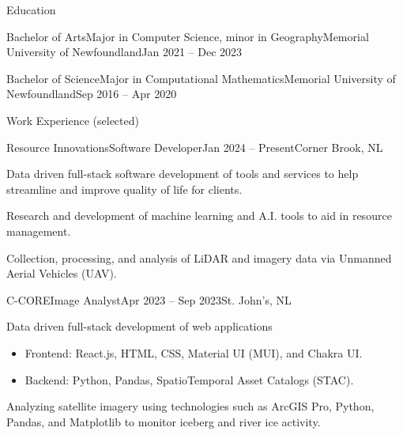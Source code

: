 \documentclass[]{Keenan-Nicholson-Resume}
\begin{document}
\resumeheader
{}
{}
{}
{}
{}

\begin{section}{Education}
    \begin{subsection}{Bachelor of Arts}{Major in Computer Science, minor in Geography}{Memorial University of Newfoundland}{Jan 2021 -- Dec 2023}
    \end{subsection}
    \begin{subsection}{Bachelor of Science}{Major in Computational Mathematics}{Memorial University of Newfoundland}{Sep 2016 -- Apr 2020}
    \end{subsection}
\end{section}

\begin{section}{Work Experience (selected)}
    \begin{subsection}{Resource Innovations}{Software Developer}{Jan 2024 -- Present}{Corner Brook, NL}
        \item Data driven full-stack software development of tools and services to help streamline and improve quality of life for clients.
        \item Research and development of machine learning and A.I. tools to aid in resource management.
        \item Collection, processing, and analysis of LiDAR and imagery data via Unmanned Aerial Vehicles (UAV).
    \end{subsection}
    \begin{subsection}{C-CORE}{Image Analyst}{Apr 2023 -- Sep 2023}{St. John's, NL}
        \item Data driven full-stack development of web applications
        \vspace{-4pt}
            \begin{itemize}[itemsep=-6.5pt]
                \item Frontend: React.js, HTML, CSS, Material UI (MUI), and Chakra UI.
                \item Backend: Python, Pandas, SpatioTemporal Asset Catalogs (STAC).
            \end{itemize}
        \vspace{1pt}
        \item Analyzing satellite imagery using technologies such as ArcGIS Pro, Python, Pandas, and Matplotlib to \newline monitor iceberg and river ice activity.
    \end{subsection}
\end{section}
\end{document}
